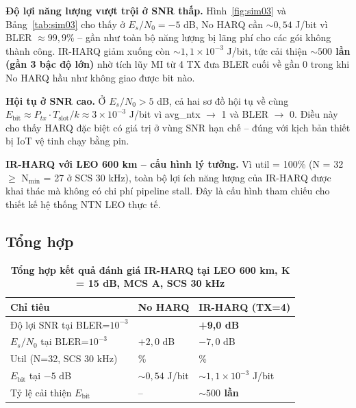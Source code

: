 \textbf{Độ lợi năng lượng vượt trội ở SNR thấp.} Hình~\ref{fig:sim03} và Bảng~\ref{tab:sim03} cho thấy ở $E_s/N_0 = -5$ dB, No HARQ cần $\sim 0{,}54$ J/bit vì BLER $\approx 99{,}9\%$ -- gần như toàn bộ năng lượng bị lãng phí cho các gói không thành công. IR-HARQ giảm xuống còn $\sim 1{,}1 \times 10^{-3}$ J/bit, tức cải thiện \textbf{$\sim 500$ lần (gần 3 bậc độ lớn)} nhờ tích lũy MI từ 4 TX đưa BLER cuối về gần 0 trong khi No HARQ hầu như không giao được bit nào.

\textbf{Hội tụ ở SNR cao.} Ở $E_s/N_0 > 5$ dB, cả hai sơ đồ hội tụ về cùng $E_{\text{bit}} \approx P_{tx} \cdot T_{\text{slot}} / k \approx 3\times 10^{-3}$ J/bit vì avg\_ntx $\to$ 1 và BLER $\to$ 0. Điều này cho thấy HARQ đặc biệt có giá trị ở vùng SNR hạn chế -- đúng với kịch bản thiết bị IoT vệ tinh chạy bằng pin.

\textbf{IR-HARQ với LEO 600 km -- cấu hình lý tưởng.} Vì util = 100\% (N = 32 $\geq$ N$_{\min}$ = 27 ở SCS 30 kHz), toàn bộ lợi ích năng lượng của IR-HARQ được khai thác mà không có chi phí pipeline stall. Đây là cấu hình tham chiếu cho thiết kế hệ thống NTN LEO thực tế.

\subsection{Tổng hợp}
\label{sec:summary}

\begin{table}[H]
    \centering
    \caption[Tổng hợp kết quả -- IR-HARQ, LEO 600 km]{\bfseries\fontsize{12pt}{0pt}\selectfont
    Tổng hợp kết quả đánh giá IR-HARQ tại LEO 600 km, K = 15 dB, MCS A, SCS 30 kHz}
    \label{tab:summary}
    \begin{tabularx}{0.98\textwidth}{
    | >{\centering\arraybackslash}X
    | >{\centering\arraybackslash}X
    | >{\centering\arraybackslash}X |}
    \hline
    \bfseries Chỉ tiêu & \bfseries No HARQ & \bfseries IR-HARQ (TX=4) \\\hline
    Độ lợi SNR tại BLER=$10^{-3}$ & 0 & \textbf{+9{,}0 dB} \\\hline
    $E_s/N_0$ tại BLER=$10^{-3}$ & $+2{,}0$ dB & $-7{,}0$ dB \\\hline
    Util (N=32, SCS 30 kHz) & 100\% & 100\% \\\hline
    $E_{\text{bit}}$ tại $-5$ dB & $\sim 0{,}54$ J/bit & $\sim 1{,}1\times 10^{-3}$ J/bit \\\hline
    Tỷ lệ cải thiện $E_{\text{bit}}$ & -- & \textbf{$\sim 500$ lần} \\\hline
    \end{tabularx}
\end{table}

